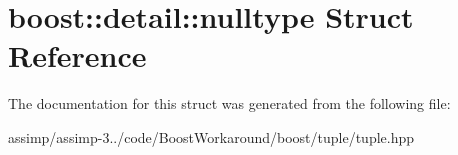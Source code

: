 \hypertarget{structboost_1_1detail_1_1nulltype}{\section{boost\+:\+:detail\+:\+:nulltype Struct Reference}
\label{structboost_1_1detail_1_1nulltype}
}


The documentation for this struct was generated from the following file\+:\begin{DoxyCompactItemize}
\item 
assimp/assimp-\/3../code/\+Boost\+Workaround/boost/tuple/tuple.\+hpp\end{DoxyCompactItemize}
